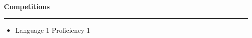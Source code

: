 

\textbf{Competitions}

\par\noindent\rule{\textwidth}{0.2pt}


\begin{itemize}
    \item {{Language 1} %
            {Proficiency 1}} %
\end{itemize}
